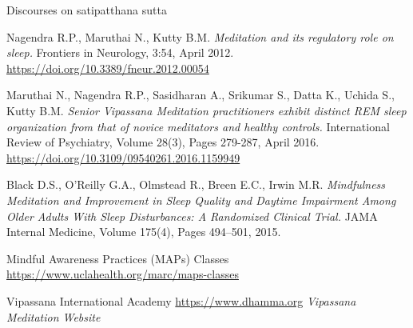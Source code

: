 \documentclass[a4paper, amsfonts, amssymb, amsmath, reprint, showkeys, nofootinbib, twoside]{revtex4-1}
\begin{document}
\begin{thebibliography}{99}
  Discourses on satipatthana sutta

  Nagendra R.P., Maruthai N., Kutty B.M.
  \textit{Meditation and its regulatory role on sleep.}
  Frontiers in Neurology, 3:54, April 2012.
  \url{https://doi.org/10.3389/fneur.2012.00054}

  Maruthai N., Nagendra R.P., Sasidharan A., Srikumar S., Datta K., Uchida S., Kutty B.M.
  \textit{Senior Vipassana Meditation practitioners exhibit distinct REM sleep
    organization from that of novice meditators and healthy controls.}
  International Review of Psychiatry, Volume 28(3), Pages 279-287, April 2016.
  \url{https://doi.org/10.3109/09540261.2016.1159949}

  Black D.S., O’Reilly G.A., Olmstead R., Breen E.C., Irwin M.R.
  \textit{Mindfulness Meditation and Improvement in Sleep Quality and Daytime Impairment
    Among Older Adults With Sleep Disturbances: A Randomized Clinical Trial.}
  JAMA Internal Medicine, Volume 175(4), Pages 494–501, 2015.

  Mindful Awareness Practices (MAPs) Classes
  \url{https://www.uclahealth.org/marc/maps-classes}

  Vipassana International Academy
  \url{https://www.dhamma.org}
  \textit{Vipassana Meditation Website}


\end{thebibliography}
\end{document}
